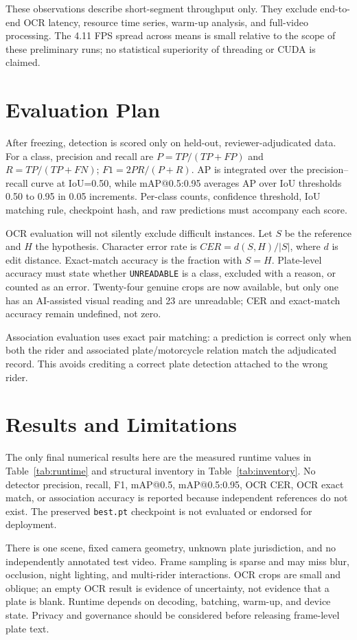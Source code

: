 \documentclass[journal]{IEEEtran}
\begin{document}
These observations describe short-segment throughput only. They exclude end-to-end OCR latency, resource time series, warm-up analysis, and full-video processing. The 4.11 FPS spread across means is small relative to the scope of these preliminary runs; no statistical superiority of threading or CUDA is claimed.

\section{Evaluation Plan}
After freezing, detection is scored only on held-out, reviewer-adjudicated data. For a class, precision and recall are $P=TP/(TP+FP)$ and $R=TP/(TP+FN)$; $F1=2PR/(P+R)$. AP is integrated over the precision--recall curve at IoU=0.50, while mAP@0.5:0.95 averages AP over IoU thresholds 0.50 to 0.95 in 0.05 increments. Per-class counts, confidence threshold, IoU matching rule, checkpoint hash, and raw predictions must accompany each score.

OCR evaluation will not silently exclude difficult instances. Let $S$ be the reference and $H$ the hypothesis. Character error rate is $CER=d(S,H)/|S|$, where $d$ is edit distance. Exact-match accuracy is the fraction with $S=H$. Plate-level accuracy must state whether \texttt{UNREADABLE} is a class, excluded with a reason, or counted as an error. Twenty-four genuine crops are now available, but only one has an AI-assisted visual reading and 23 are unreadable; CER and exact-match accuracy remain undefined, not zero.

Association evaluation uses exact pair matching: a prediction is correct only when both the rider and associated plate/motorcycle relation match the adjudicated record. This avoids crediting a correct plate detection attached to the wrong rider.

\section{Results and Limitations}
The only final numerical results here are the measured runtime values in Table~\ref{tab:runtime} and structural inventory in Table~\ref{tab:inventory}. No detector precision, recall, F1, mAP@0.5, mAP@0.5:0.95, OCR CER, OCR exact match, or association accuracy is reported because independent references do not exist. The preserved \texttt{best.pt} checkpoint is not evaluated or endorsed for deployment.

There is one scene, fixed camera geometry, unknown plate jurisdiction, and no independently annotated test video. Frame sampling is sparse and may miss blur, occlusion, night lighting, and multi-rider interactions. OCR crops are small and oblique; an empty OCR result is evidence of uncertainty, not evidence that a plate is blank. Runtime depends on decoding, batching, warm-up, and device state. Privacy and governance should be considered before releasing frame-level plate text.
\end{document}

